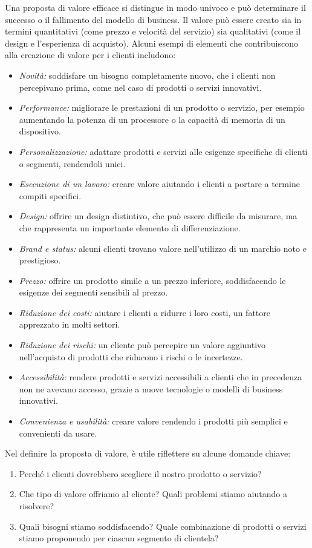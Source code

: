 Una proposta di valore efficace si distingue in modo univoco e può determinare il successo o il fallimento del modello di business. Il valore può essere creato sia in termini quantitativi (come prezzo e velocità del servizio) sia qualitativi (come il design e l’esperienza di acquisto). Alcuni esempi di elementi che contribuiscono alla creazione di valore per i clienti includono:
\begin{itemize}
    \item \textit{Novità:} soddisfare un bisogno completamente nuovo, che i clienti non percepivano prima, come nel caso di prodotti o servizi innovativi.
    \item \textit{Performance:} migliorare le prestazioni di un prodotto o servizio, per esempio aumentando la potenza di un processore o la capacità di memoria di un dispositivo.
    \item \textit{Personalizzazione:} adattare prodotti e servizi alle esigenze specifiche di clienti o segmenti, rendendoli unici.
    \item \textit{Esecuzione di un lavoro:} creare valore aiutando i clienti a portare a termine compiti specifici.
    \item \textit{Design:} offrire un design distintivo, che può essere difficile da misurare, ma che rappresenta un importante elemento di differenziazione.
    \item \textit{Brand e status:} alcuni clienti trovano valore nell'utilizzo di un marchio noto e prestigioso.
    \item \textit{Prezzo:} offrire un prodotto simile a un prezzo inferiore, soddisfacendo le esigenze dei segmenti sensibili al prezzo.
    \item \textit{Riduzione dei costi:} aiutare i clienti a ridurre i loro costi, un fattore apprezzato in molti settori.
    \item \textit{Riduzione dei rischi:} un cliente può percepire un valore aggiuntivo nell’acquisto di prodotti che riducono i rischi o le incertezze.
    \item \textit{Accessibilità:} rendere prodotti e servizi accessibili a clienti che in precedenza non ne avevano accesso, grazie a nuove tecnologie o modelli di business innovativi.
    \item \textit{Convenienza e usabilità:} creare valore rendendo i prodotti più semplici e convenienti da usare.
\end{itemize}
Nel definire la proposta di valore, è utile riflettere su alcune domande chiave:
\begin{enumerate}
    \item Perché i clienti dovrebbero scegliere il nostro prodotto o servizio?
    \item Che tipo di valore offriamo al cliente? Quali problemi stiamo aiutando a risolvere?
    \item Quali bisogni stiamo soddisfacendo? Quale combinazione di prodotti o servizi stiamo proponendo per ciascun segmento di clientela?
\end{enumerate}

